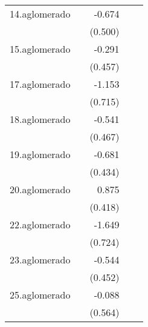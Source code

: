 {\begin{longtable}{l*{4}{D{.}{.}{-1}}}
\addlinespace
14.aglomerado&                     &      -0.674         &                     &                     \\
            &                     &     (0.500)         &                     &                     \\
\addlinespace
15.aglomerado&                     &      -0.291         &                     &                     \\
            &                     &     (0.457)         &                     &                     \\
\addlinespace
17.aglomerado&                     &      -1.153         &                     &                     \\
            &                     &     (0.715)         &                     &                     \\
\addlinespace
18.aglomerado&                     &      -0.541         &                     &                     \\
            &                     &     (0.467)         &                     &                     \\
\addlinespace
19.aglomerado&                     &      -0.681         &                     &                     \\
            &                     &     (0.434)         &                     &                     \\
\addlinespace
20.aglomerado&                     &       0.875\sym{*}  &                     &                     \\
            &                     &     (0.418)         &                     &                     \\
\addlinespace
22.aglomerado&                     &      -1.649\sym{*}  &                     &                     \\
            &                     &     (0.724)         &                     &                     \\
\addlinespace
23.aglomerado&                     &      -0.544         &                     &                     \\
            &                     &     (0.452)         &                     &                     \\
\addlinespace
25.aglomerado&                     &      -0.088         &                     &                     \\
            &                     &     (0.564)         &                     &                     \\

\end{longtable}}
